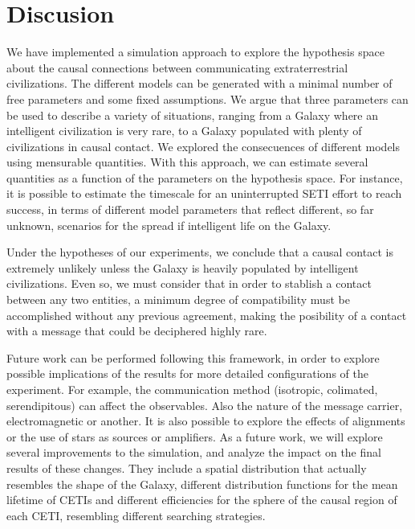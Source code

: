 \documentclass[crop]{CSLB}%
\begin{document}
\section{Discusion}\label{S_discussion}

We have implemented a simulation approach to explore the hypothesis
space about the causal connections between communicating
extraterrestrial civilizations.
%
The different models can be generated with a minimal number of free
parameters and some fixed assumptions.
%
We argue that three parameters can be used to describe a variety of
situations, ranging from a Galaxy where an intelligent civilization is
very rare, to a Galaxy populated with plenty of civilizations in
causal contact.
%
We explored the consecuences of different models using mensurable
quantities.
%
With this approach, we can estimate several quantities as a function
of the parameters on the hypothesis space.
%
For instance, it is possible to estimate the timescale for an
uninterrupted SETI effort to reach success, in terms of different
model parameters that reflect different, so far unknown, scenarios
for the spread if intelligent life on the Galaxy.


Under the hypotheses of our experiments, we conclude that
a causal contact is extremely unlikely unless the Galaxy is heavily
populated by intelligent civilizations.
%
Even so, we must consider that in order to stablish a contact between
any two entities, a minimum degree of compatibility must be
accomplished without any previous agreement, 
making the posibility of a contact with a message that
could be deciphered highly rare.


Future work can be performed following this framework, in order to
explore possible implications of the results for more detailed 
configurations of the experiment.
%
For example, the communication method (isotropic, colimated,
serendipitous) can affect the observables.
%
Also the nature of the message carrier, electromagnetic or another.
%
It is also possible to explore the effects of alignments or the use of
stars as sources or amplifiers.
%
%
As a future work, we will explore several improvements to the
simulation, and analyze the impact on the final results of these
changes.
%
They include a spatial distribution that actually resembles the shape
of the Galaxy, different distribution functions for the mean lifetime
of CETIs and different efficiencies for the sphere of the causal
region of each CETI, resembling different searching strategies.
 

                       





\end{document}
